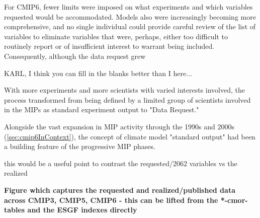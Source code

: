 \documentclass[gmd, preprint]{copernicus}
\newcommand{\mycomment}[1]{}
\def\cred#1{{\color{red}#1}}
\begin{document}
For CMIP6, fewer limits were imposed on what experiments and which variables requested would be accommodated.  Models also were increasingly becoming more comprehensive, and no single individual could provide careful review of the list of variables to eliminate variables that were, perhaps, either too difficult to routinely report or of insufficient interest to warrant being included. Consequently, although the data request grew  


\cred{KARL, I think you can fill in the blanks better than I here...}

With more experiments and more scientists with varied interests involved, the process transformed from being defined by a limited group of scientists involved in the MIPs as standard experiment output to "Data Request."

Alongside the vast expansion in MIP activity through the 1990s and 2000s (\autoref{sec:cmip6InContext}), the concept of climate model "standard output" had been a building feature of the progressive MIP phases.

\cred{this would be a useful point to contrast the requested/2062 variables vs the realized}

\mycomment{
The CMIP6 "data request" \citep{juckes_cmip6_2020} was the most comprehensively outlined preceded by three decades of evolution in climate model understanding. This history underpinned the development of the standard experimental protocols 
\citet{gates_amip_1991} - AMIP1
\citet{gates_amip_1993} - AMIP History Archive
\citet{gates_amip_1994} - AMIP Ensemble
\citet{gleckler_amip_1996} - AMIP 7 monthly mean and six-hourly output, plus ensembles/AMIP 2
\citet{gleckler_amip_1996-1} - AMIP number 8, STANDARD OUTPUT low and high frequency (6-hr)
https://pcmdi.llnl.gov/mips/amip/OUTPUT/WGNEDIAGS/index.html
\citet{taylor_pcmdi_2009}
\citet{taylor_pcmdi_2013}
\citet{juckes_baseline_2024}

FANGIO not multi-year (perpetual July)/January; AMIP1 success, multi-year SST/sea-ice (Russians and Chinese); AMIP2 next-level output, more high frequency data, mean products (covariances; u/v-prime overbar - on the fly calculation) monthly mean timeseries (Boer \& Lambert 2008, clim dyn - relationship to Lorenz energy cycle)
CMIP2: https://pcmdi.llnl.gov/mips/cmip2/
CMIP3: https://pcmdi.llnl.gov/mips/cmip3/experiment.html
CMIP5: https://pcmdi.llnl.gov/mips/cmip5/requirements.html
}
\cred{\textbf{Figure which captures the requested and realized/published data across CMIP3, CMIP5, CMIP6 - this can be lifted from the *-cmor-tables and the ESGF indexes directly}}
\end{document}
